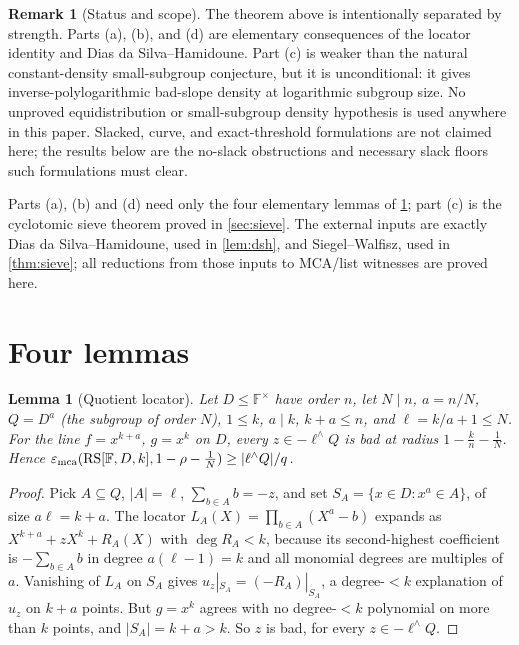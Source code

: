 \documentclass[11pt]{article}
\newtheorem{lemma}[lemma]{Lemma}
\theoremstyle{definition}
\newtheorem{remark}[remark]{Remark}
\newcommand{\F}{\mathbb F}
\newcommand{\RS}{\operatorname{RS}}
\newcommand{\eps}{\varepsilon}
\begin{document}
\begin{remark}[Status and scope]\label{rem:status-scope}
The theorem above is intentionally separated by strength.  Parts (a), (b), and (d) are elementary consequences of the locator identity and Dias da Silva--Hamidoune.  Part (c) is weaker than the natural constant-density small-subgroup conjecture, but it is unconditional: it gives inverse-polylogarithmic bad-slope density at logarithmic subgroup size.  No unproved equidistribution or small-subgroup density hypothesis is used anywhere in this paper.  Slacked, curve, and exact-threshold formulations are not claimed here; the results below are the no-slack obstructions and necessary slack floors such formulations must clear.
\end{remark}

Parts (a), (b) and (d) need only the four elementary lemmas of \cref{sec:lemmas}; part (c) is the cyclotomic sieve theorem proved in \cref{sec:sieve}.  The external inputs are exactly Dias da Silva--Hamidoune, used in \cref{lem:dsh}, and Siegel--Walfisz, used in \cref{thm:sieve}; all reductions from those inputs to MCA/list witnesses are proved here.

\section{Four lemmas}\label{sec:lemmas}

\begin{lemma}[Quotient locator]\label{lem:locator}
Let $D\le\F^\times$ have order $n$, let $N\mid n$, $a=n/N$, $Q=D^a$ (the subgroup of order $N$), $1\le k$, $a\mid k$, $k+a\le n$, and $\ell=k/a+1\le N$.  For the line $f=x^{k+a}$, $g=x^k$ on $D$, every $z\in-\ell^{\wedge}Q$ is bad at radius $1-\frac kn-\frac1N$.  Hence $\eps_{\rm mca}(\RS[\F,D,k],1-\rho-\frac1N)\ge|\ell^{\wedge}Q|/q$.
\end{lemma}

\begin{proof}
Pick $A\subseteq Q$, $|A|=\ell$, $\sum_{b\in A}b=-z$, and set $S_A=\{x\in D:x^a\in A\}$, of size $a\ell=k+a$.  The locator $L_A(X)=\prod_{b\in A}(X^a-b)$ expands as $X^{k+a}+zX^k+R_A(X)$ with $\deg R_A<k$, because its second-highest coefficient is $-\sum_{b\in A}b$ in degree $a(\ell-1)=k$ and all monomial degrees are multiples of $a$.  Vanishing of $L_A$ on $S_A$ gives $u_z|_{S_A}=(-R_A)|_{S_A}$, a degree-$<k$ explanation of $u_z$ on $k+a$ points.  But $g=x^k$ agrees with no degree-$<k$ polynomial on more than $k$ points, and $|S_A|=k+a>k$.  So $z$ is bad, for every $z\in-\ell^{\wedge}Q$.
\end{proof}
\end{document}
